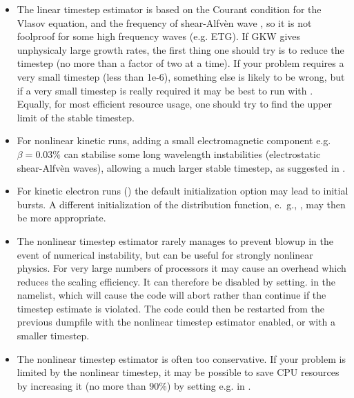 \begin{itemize}

\item The linear timestep estimator is based on the Courant condition for the
       Vlasov equation, and the frequency of shear-Alfv\`{e}n wave \cite{LEE01}, so it is not
       foolproof for some high frequency waves (e.g. ETG). If GKW gives unphysicaly large growth
       rates, the first thing one should try is to reduce the timestep (no more
       than a factor of two at a time). If your problem requires a very small
       timestep (less than 1e-6), something else is likely to be wrong, but if
       a very small timestep is really required it may be best to run with
       . Equally, for most efficient resource usage,
       one should try to find the upper limit of the stable timestep.

\item For nonlinear kinetic runs, adding a small electromagnetic component e.g.
       $\beta=0.03\%$ can stabilise some long wavelength instabilities
       (electrostatic shear-Alfv\`{e}n waves), allowing a much larger stable
       timestep, as suggested in \cite{MER10}. 
       
\item For kinetic electron runs () the default 
      initialization option  may lead to 
      initial bursts. A different initialization of the distribution function, 
      e.~g., , may then be more appropriate.

\item The nonlinear timestep estimator rarely manages to prevent blowup in the
       event of numerical instability, but can be useful for strongly nonlinear
       physics.   For very large numbers of processors it may cause an overhead
       which reduces the scaling efficiency.  It can therefore be disabled
       by setting.  in the  namelist, which
       will cause the code will abort rather than continue if the timestep
       estimate is violated.  The code could then be restarted from the previous
       dumpfile with the nonlinear timestep estimator enabled, or with a smaller
       timestep.

\item The nonlinear timestep estimator is often too conservative.  
      If your problem is limited by the nonlinear timestep, 
      it may be possible to save CPU resources by increasing it (no more than $90\%$) 
      by setting e.g.  in .


\end{itemize}
